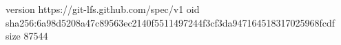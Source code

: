 version https://git-lfs.github.com/spec/v1
oid sha256:6a98d5208a47c89563ec2140f5511497244f3cf3da947164518317025968fcdf
size 87544
